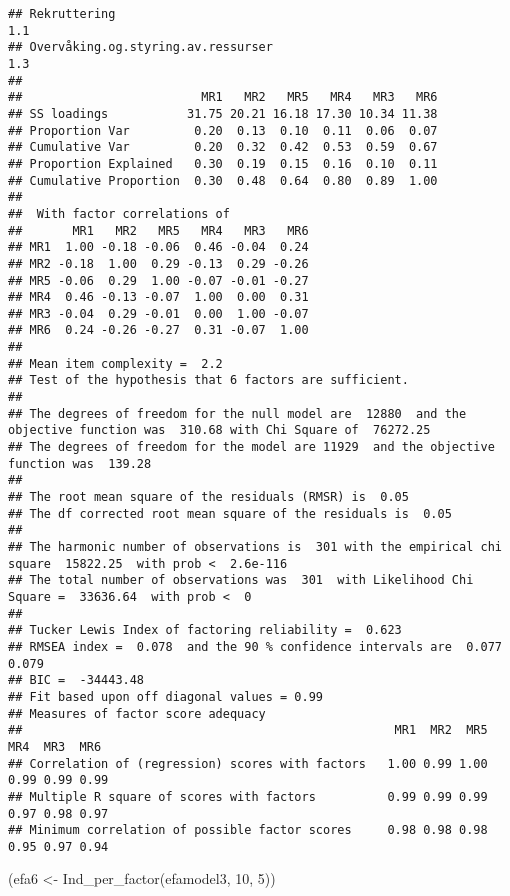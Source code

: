 \documentclass[
]{article}
\newenvironment{Shaded}{\begin{snugshade}}{\end{snugshade}}
\newcommand{\DecValTok}[1]{\textcolor[rgb]{0.00,0.00,0.81}{#1}}
\newcommand{\FunctionTok}[1]{\textcolor[rgb]{0.00,0.00,0.00}{#1}}
\newcommand{\NormalTok}[1]{#1}
\newcommand{\OtherTok}[1]{\textcolor[rgb]{0.56,0.35,0.01}{#1}}
\begin{document}
\begin{verbatim}
## Rekruttering                                                                     1.1
## Overvåking.og.styring.av.ressurser                                               1.3
## 
##                         MR1   MR2   MR5   MR4   MR3   MR6
## SS loadings           31.75 20.21 16.18 17.30 10.34 11.38
## Proportion Var         0.20  0.13  0.10  0.11  0.06  0.07
## Cumulative Var         0.20  0.32  0.42  0.53  0.59  0.67
## Proportion Explained   0.30  0.19  0.15  0.16  0.10  0.11
## Cumulative Proportion  0.30  0.48  0.64  0.80  0.89  1.00
## 
##  With factor correlations of 
##       MR1   MR2   MR5   MR4   MR3   MR6
## MR1  1.00 -0.18 -0.06  0.46 -0.04  0.24
## MR2 -0.18  1.00  0.29 -0.13  0.29 -0.26
## MR5 -0.06  0.29  1.00 -0.07 -0.01 -0.27
## MR4  0.46 -0.13 -0.07  1.00  0.00  0.31
## MR3 -0.04  0.29 -0.01  0.00  1.00 -0.07
## MR6  0.24 -0.26 -0.27  0.31 -0.07  1.00
## 
## Mean item complexity =  2.2
## Test of the hypothesis that 6 factors are sufficient.
## 
## The degrees of freedom for the null model are  12880  and the objective function was  310.68 with Chi Square of  76272.25
## The degrees of freedom for the model are 11929  and the objective function was  139.28 
## 
## The root mean square of the residuals (RMSR) is  0.05 
## The df corrected root mean square of the residuals is  0.05 
## 
## The harmonic number of observations is  301 with the empirical chi square  15822.25  with prob <  2.6e-116 
## The total number of observations was  301  with Likelihood Chi Square =  33636.64  with prob <  0 
## 
## Tucker Lewis Index of factoring reliability =  0.623
## RMSEA index =  0.078  and the 90 % confidence intervals are  0.077 0.079
## BIC =  -34443.48
## Fit based upon off diagonal values = 0.99
## Measures of factor score adequacy             
##                                                    MR1  MR2  MR5  MR4  MR3  MR6
## Correlation of (regression) scores with factors   1.00 0.99 1.00 0.99 0.99 0.99
## Multiple R square of scores with factors          0.99 0.99 0.99 0.97 0.98 0.97
## Minimum correlation of possible factor scores     0.98 0.98 0.98 0.95 0.97 0.94
\end{verbatim}

\begin{Shaded}
\begin{Highlighting}[]
\NormalTok{(efa6 }\OtherTok{\textless{}{-}} \FunctionTok{Ind\_per\_factor}\NormalTok{(efamodel3, }\DecValTok{10}\NormalTok{, }\DecValTok{5}\NormalTok{))}
\end{Highlighting}
\end{Shaded}
\end{document}
